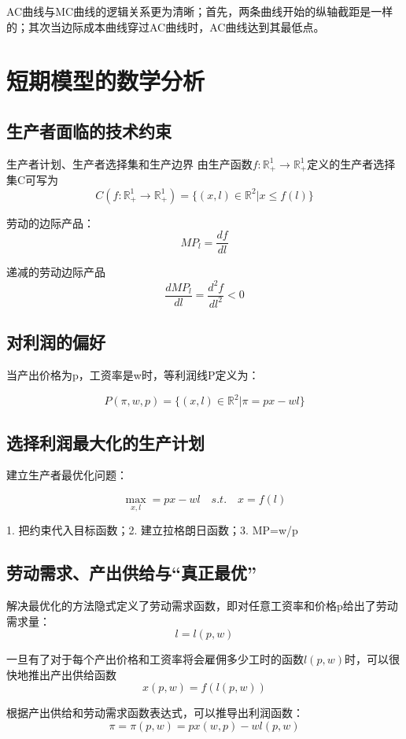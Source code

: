 \documentclass{article}
\begin{document}
AC曲线与MC曲线的逻辑关系更为清晰；首先，两条曲线开始的纵轴截距是一样的；其次当边际成本曲线穿过AC曲线时，AC曲线达到其最低点。

\section{短期模型的数学分析}
\subsection{生产者面临的技术约束}

生产者计划、生产者选择集和生产边界
由生产函数$ f:\mathbb{R}^1_+\rightarrow\mathbb{R}^1_+ $定义的生产者选择集C可写为
\[
C( f:\mathbb{R}^1_+\rightarrow\mathbb{R}^1_+)=\{(x,l)\in\mathbb{R}^2|x\le f(l)\}
\]

劳动的边际产品：
\[
MP_l=\frac{df}{dl}
\]

递减的劳动边际产品
\[
\frac{dMP_l}{dl}=\frac{d^2f}{dl^2}<0
\]

\subsection{对利润的偏好}

当产出价格为p，工资率是w时，等利润线P定义为：

\[
P(\pi,w,p)=\{(x,l)\in\mathbb{R}^2|\pi=px-wl\}
\]

\subsection{选择利润最大化的生产计划}

建立生产者最优化问题：

\[
\max\limits_{x,l}=px-wl\quad s.t.\quad x=f(l)
\]

1. 把约束代入目标函数；2. 建立拉格朗日函数；3. MP=w/p

\subsection{劳动需求、产出供给与“真正最优”}

解决最优化的方法隐式定义了劳动需求函数，即对任意工资率和价格p给出了劳动需求量：
\[
l=l(p,w)
\]

一旦有了对于每个产出价格和工资率将会雇佣多少工时的函数$ l(p,w) $时，可以很快地推出产出供给函数
\[
x(p,w)=f(l(p,w))
\]

根据产出供给和劳动需求函数表达式，可以推导出利润函数：
\[
\pi=\pi(p,w)=px(w,p)-wl(p,w)
\]

\hspace*{\fill}
\end{document}
